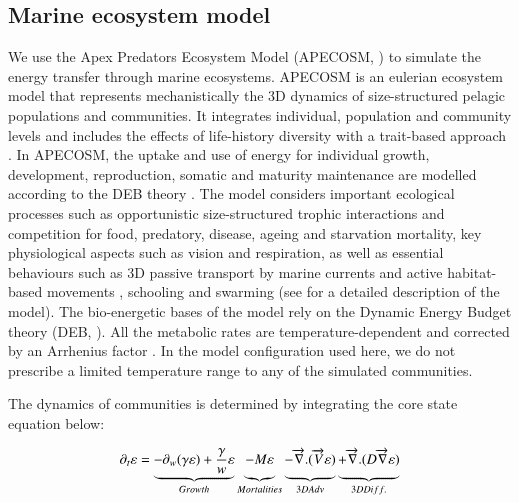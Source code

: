 \subsection{Marine ecosystem model}
\label{sec:apecosm}

We use the Apex Predators Ecosystem Model (APECOSM, \citealp{mauryModelingEnvironmentalEffects2007, mauryOverviewAPECOSMSpatialized2010}) to simulate the energy transfer through marine ecosystems. 
APECOSM is an eulerian ecosystem model that represents mechanistically the 3D dynamics of size-structured pelagic populations and communities. It integrates individual, population and community levels and includes the effects of life-history diversity with a trait-based approach \citep{mauryIndividualsPopulationsCommunities2013}. In APECOSM, the uptake and use of energy for individual growth, development, reproduction, somatic and maturity maintenance are modelled according to the DEB theory \citep{koojmanDynamicEnergyBudget2010}. The model considers important ecological processes such as opportunistic size-structured trophic interactions and competition for food, predatory, disease, ageing and starvation mortality, key physiological aspects such as vision and respiration, as well as essential behaviours such as 3D passive transport by marine currents and active habitat-based movements \citep{faugerasAdvectiondiffusionreactionSizestructuredFish2005}, schooling and swarming (see \citealp{mauryModelingEnvironmentalEffects2007, mauryIndividualsPopulationsCommunities2013, mauryCanSchoolingRegulate2017} for a detailed description of the model). 
The bio-energetic bases of the model rely on the Dynamic Energy Budget theory (DEB, \citealp{koojmanDynamicEnergyBudget2010}). All the metabolic rates are temperature-dependent and corrected by an Arrhenius factor \citep{mauryModelingEnvironmentalEffects2007, mauryIndividualsPopulationsCommunities2013}. In the model configuration used here, we do not prescribe a limited temperature range to any of the simulated communities.

The dynamics of communities is determined by integrating the core state equation below:

\begin{equation}
\partial_t \varepsilon = \underbrace{- \partial_w(\gamma \varepsilon) + \frac{\gamma}{w}\varepsilon}_{Growth} 
\underbrace{- M \varepsilon \vphantom{\frac{\gamma}{w}\varepsilon}}_{Mortalities}
\underbrace{-\overrightarrow{\nabla}.(\overrightarrow{V} \varepsilon) \vphantom{\frac{\gamma}{w}\varepsilon}}_{3D Adv} 
\underbrace{+ \overrightarrow{\nabla} . (D \overrightarrow{\nabla} \varepsilon) \vphantom{\frac{\gamma}{w}\varepsilon}}_{3D Diff.}
\label{eq:apecosm_trend}
\end{equation}

